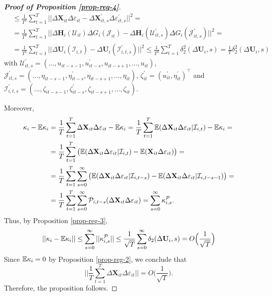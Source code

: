 \documentclass[a4paper,12pt]{article}
\begin{document}
\begin{proof}[\textnormal{\textbf{Proof of Proposition \ref{prop-reg-4}}}]
\begin{align*}
&\leq \frac{1}{T^2} \sum_{t=1}^T \Big|\Big| \Delta \mathbf{X}_{it}\Delta \varepsilon_{it} -\Delta \mathbf{X}_{it, s}^\prime\Delta \varepsilon_{it, s}^\prime\Big|\Big|^2 =\\
& = \frac{1}{T^2} \sum_{t=1}^T \Big|\Big| \Delta \mathbf{H}_i(\mathcal{U}_{it})  \Delta G_i(\mathcal{J}_{it}) - \Delta \mathbf{H}_i(\mathcal{U}_{it, s}^\prime)  \Delta G_i(\mathcal{J}_{it, s}^\prime)\Big|\Big|^2 =\\
& = \frac{1}{T^2} \sum_{t=1}^T \Big|\Big| \Delta \mathbf{U}_i(\mathcal{I}_{i,t})  - \Delta \mathbf{U}_i(\mathcal{I}_{i,t, s}^\prime) \Big|\Big|^2 \leq \frac{1}{T^2} \sum_{t=1}^T \delta_2^2(\Delta \mathbf{U}_i, s) = \frac{1}{T}\delta_2^2(\Delta \mathbf{U}_i, s)
\end{align*}
with $\mathcal{U}_{it, s}^\prime = (\ldots, u_{it-s-1}, u^\prime_{it-s}, u_{it-s+1}, \ldots, u_{it})$, $\mathcal{J}_{it, s}^\prime = (\ldots, \eta_{it-s-1}, \eta^\prime_{it-s}, \eta_{it-s+1}, \ldots, \eta_{it})$, $\zeta^\prime_{it} = (u_{it}^\prime, \eta_{it}^\prime)^\top$ and $\mathcal{I}_{i,t,s}^\prime =(\ldots, \zeta_{it-s-1}, \zeta^\prime_{it-s}, \zeta_{it-s+1}, \ldots, \zeta_{it})$.

Moreover,
\begin{align*}
\kappa_i - \mathbb{E} \kappa_i &= \frac{1}{T}\sum_{t=1}^T \Delta \mathbf{X}_{it}\Delta \varepsilon_{it} - \mathbb{E} \kappa_i = \frac{1}{T}\sum_{t=1}^T \mathbb{E} ( \Delta \mathbf{X}_{it}\Delta \varepsilon_{it}|\mathcal{I}_{i,t}) - \mathbb{E} \kappa_i =\\
&= \frac{1}{T}\sum_{t=1}^T \big( \mathbb{E} ( \Delta \mathbf{X}_{it}\Delta \varepsilon_{it}|\mathcal{I}_{i,t} ) - \mathbb{E} ( \mathbf{X}_{it}\Delta \varepsilon_{it}) \big) = \\
&= \frac{1}{T}\sum_{t=1}^T \sum_{s=0}^\infty \big( \mathbb{E} ( \Delta \mathbf{X}_{it}\Delta \varepsilon_{it}|\mathcal{I}_{i,t-s} ) - \mathbb{E} ( \Delta \mathbf{X}_{it}\Delta \varepsilon_{it}|\mathcal{I}_{i,t-s-1} )  \big) =\\
&= \frac{1}{T}\sum_{t=1}^T \sum_{s=0}^\infty \mathcal{P}_{i, t-s} (\Delta \mathbf{X}_{it}\Delta \varepsilon_{it}) = \sum_{s=0}^\infty \kappa_{i, s}^{\mathcal{P}}.
\end{align*}
Thus, by Proposition \ref{prop-reg-3},
\[ || \kappa_i - \mathbb{E} \kappa_i || \leq \sum_{s=0}^\infty ||\kappa_{i, s}^{\mathcal{P}} || \leq \frac{1}{\sqrt{T}}\sum_{s=0}^\infty \delta_2(\Delta \mathbf{U}_i, s) = O\Big(\frac{1}{\sqrt{T}}\Big)
\]
Since $\mathbb{E} \kappa_i = 0$ by Proposition \ref{prop-reg-2}, we conclude that
\[  \Big|\Big| \frac{1}{T}\sum_{t=1}^T  \Delta \mathbf{X}_{it}\Delta \varepsilon_{it} \Big|\Big| = O\Big(\frac{1}{\sqrt{T}}\Big).
\]
Therefore, the proposition follows.
\end{proof}
\end{document}

